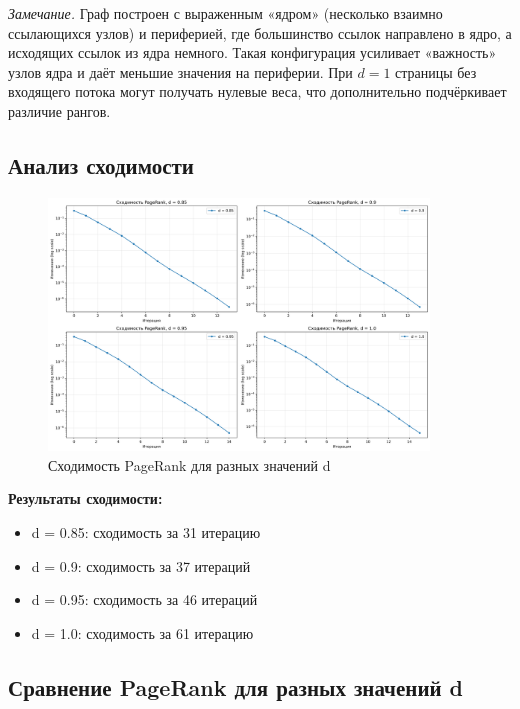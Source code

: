 \noindent\textit{Замечание.} Граф построен с выраженным «ядром» (несколько взаимно ссылающихся узлов) и периферией, где большинство ссылок направлено в ядро, а исходящих ссылок из ядра немного. Такая конфигурация усиливает «важность» узлов ядра и даёт меньшие значения на периферии. При $d=1$ страницы без входящего потока могут получать нулевые веса, что дополнительно подчёркивает различие рангов.

\subsection*{Анализ сходимости}

\begin{figure}[H]
    \centering
    \includegraphics[width=0.9\textwidth]{images/task2/pagerank_convergence.png}
    \caption{Сходимость PageRank для разных значений d}
\end{figure}

\textbf{Результаты сходимости:}
\begin{itemize}
    \item d = 0.85: сходимость за 31 итерацию
    \item d = 0.9: сходимость за 37 итераций
    \item d = 0.95: сходимость за 46 итераций
    \item d = 1.0: сходимость за 61 итерацию
\end{itemize}

\subsection*{Сравнение PageRank для разных значений d}

